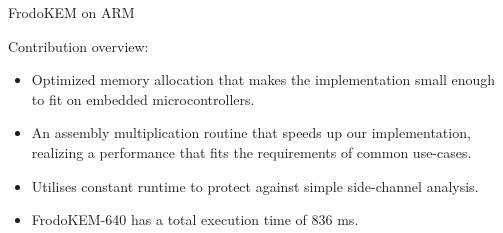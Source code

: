 \documentclass{beamer}            %
\begin{document}
\begin{frame}{FrodoKEM on ARM}

Contribution overview:

\begin{itemize}
\item Optimized memory allocation that makes the implementation small enough to fit on embedded microcontrollers.

\item An assembly multiplication routine that speeds up our implementation, realizing a performance that fits the requirements of common use-cases.

\item Utilises constant runtime to protect against simple side-channel analysis.

\item \textsf{FrodoKEM-640} has a total execution time of 836 ms.

\end{itemize}
\end{frame}

\end{document}
